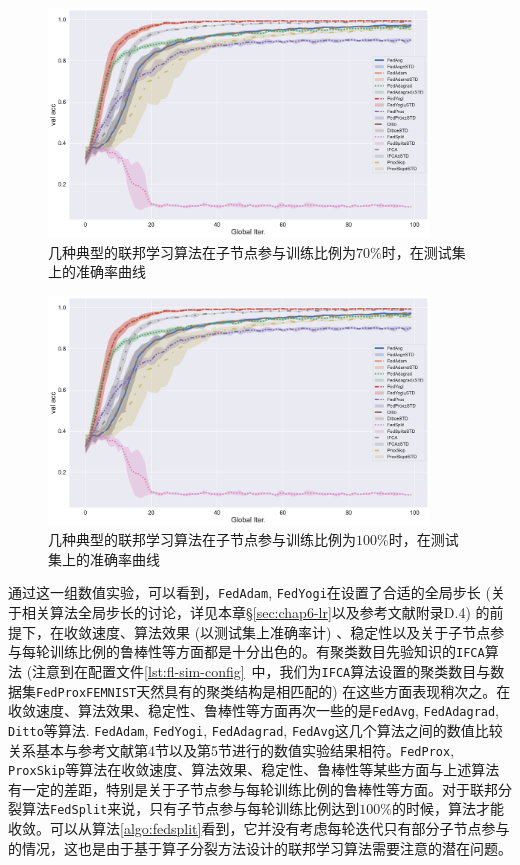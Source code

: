 \begin{figure}[H]
    \centering
    \includegraphics[width=0.9\textwidth]{figures/standard-test-ratio-70-val-acc.pdf}
    \caption{几种典型的联邦学习算法在子节点参与训练比例为$70\%$时，在测试集上的准确率曲线}
    \label{fig:standard-test-ratio-70-val-acc}
\end{figure}

\begin{figure}[ht]
    \centering
    \includegraphics[width=0.9\textwidth]{figures/standard-test-ratio-70-val-acc.pdf}
    \caption{几种典型的联邦学习算法在子节点参与训练比例为$100\%$时，在测试集上的准确率曲线}
    \label{fig:standard-test-ratio-100-val-acc}
\end{figure}

通过这一组数值实验，可以看到，\texttt{FedAdam}, \texttt{FedYogi}在设置了合适的全局步长 (关于相关算法全局步长的讨论，详见本章\S\ref{sec:chap6-lr}以及参考文献\parencite{reddi2020fed_opt}附录D.4) 的前提下，在收敛速度、算法效果 (以测试集上准确率计) 、稳定性以及关于子节点参与每轮训练比例的鲁棒性等方面都是十分出色的。有聚类数目先验知识的\texttt{IFCA}算法 (注意到在配置文件\ref{lst:fl-sim-config}~中，我们为\texttt{IFCA}算法设置的聚类数目与数据集\texttt{FedProxFEMNIST}天然具有的聚类结构是相匹配的) 在这些方面表现稍次之。在收敛速度、算法效果、稳定性、鲁棒性等方面再次一些的是\texttt{FedAvg}, \texttt{FedAdagrad}, \texttt{Ditto}等算法. \texttt{FedAdam}, \texttt{FedYogi}, \texttt{FedAdagrad}, \texttt{FedAvg}这几个算法之间的数值比较关系基本与参考文献\parencite{reddi2020fed_opt}第4节以及第5节进行的数值实验结果相符。\texttt{FedProx}, \texttt{ProxSkip}等算法在收敛速度、算法效果、稳定性、鲁棒性等某些方面与上述算法有一定的差距，特别是关于子节点参与每轮训练比例的鲁棒性等方面。对于联邦分裂算法\texttt{FedSplit}来说，只有子节点参与每轮训练比例达到$100\%$的时候，算法才能收敛。可以从算法\ref{algo:fedsplit}看到，它并没有考虑每轮迭代只有部分子节点参与的情况，这也是由于基于算子分裂方法设计的联邦学习算法需要注意的潜在问题。
